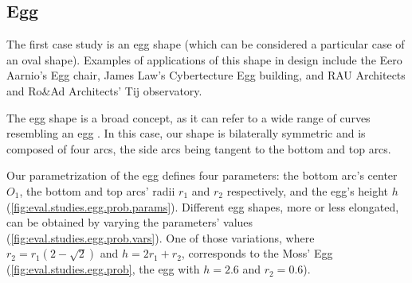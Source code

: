 \subsection{Egg}%
\label{sec:eval.studies.egg}

The first case study is an egg shape (which can be considered a particular case
of an oval shape).  Examples of applications of this shape in design include the
Eero Aarnio's Egg chair, James Law's Cybertecture Egg building, and RAU
Architects and Ro\&Ad Architects' Tij observatory.

The egg shape is a broad concept, as it can refer to a wide range of curves
resembling an egg \cite{Dixon:1991:Mathographics}.  In this case, our shape is
bilaterally symmetric and is composed of four arcs, the side arcs being tangent
to the bottom and top arcs.

Our parametrization of the egg defines four parameters: the bottom arc's center
$O_1$, the bottom and top arcs' radii $r_1$ and $r_2$ respectively, and the
egg's height $h$ (\cref{fig:eval.studies.egg.prob.params}).  Different egg
shapes, more or less elongated, can be obtained by varying the parameters'
values (\cref{fig:eval.studies.egg.prob.vars}).  One of those variations, where
$r_2 = r_1 (2 − \sqrt2)$ and $h = 2r_1 + r_2$, corresponds to the Moss' Egg
(\cref{fig:eval.studies.egg.prob}, the egg with $h = 2.6$ and $r_2 = 0.6$).

